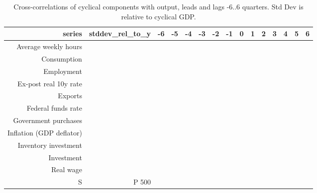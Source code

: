 \begin{table}[ht]
\centering
\caption{Cross-correlations of cyclical components with output, leads and lags -6..6 quarters. Std Dev is relative to cyclical GDP.} 
\label{tab:ccf}
\begin{tabular}{rrrrrrrrrrrrrrr}
  \hline
series & stddev_rel_to_y & -6 & -5 & -4 & -3 & -2 & -1 & 0 & 1 & 2 & 3 & 4 & 5 & 6 \\ 
  \hline
Average weekly hours &  &  &  &  &  &  &  &  &  &  &  &  &  &  \\ 
  Consumption &  &  &  &  &  &  &  &  &  &  &  &  &  &  \\ 
  Employment &  &  &  &  &  &  &  &  &  &  &  &  &  &  \\ 
  Ex-post real 10y rate &  &  &  &  &  &  &  &  &  &  &  &  &  &  \\ 
  Exports &  &  &  &  &  &  &  &  &  &  &  &  &  &  \\ 
  Federal funds rate &  &  &  &  &  &  &  &  &  &  &  &  &  &  \\ 
  Government purchases &  &  &  &  &  &  &  &  &  &  &  &  &  &  \\ 
  Inflation (GDP deflator) &  &  &  &  &  &  &  &  &  &  &  &  &  &  \\ 
  Inventory investment &  &  &  &  &  &  &  &  &  &  &  &  &  &  \\ 
  Investment &  &  &  &  &  &  &  &  &  &  &  &  &  &  \\ 
  Real wage &  &  &  &  &  &  &  &  &  &  &  &  &  &  \\ 
  S&P 500 &  &  &  &  &  &  &  &  &  &  &  &  &  &  \\ 
   \hline
\end{tabular}
\end{table}
